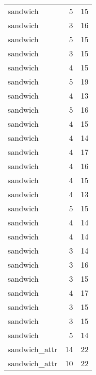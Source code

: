 \begin{table}
\begin{tabular}{lrr}
                        sandwich &         5 &        15 \\
                        sandwich &         3 &        16 \\
                        sandwich &         5 &        15 \\
                        sandwich &         3 &        15 \\
                        sandwich &         4 &        15 \\
                        sandwich &         5 &        19 \\
                        sandwich &         4 &        13 \\
                        sandwich &         5 &        16 \\
                        sandwich &         4 &        15 \\
                        sandwich &         4 &        14 \\
                        sandwich &         4 &        17 \\
                        sandwich &         4 &        16 \\
                        sandwich &         4 &        15 \\
                        sandwich &         4 &        13 \\
                        sandwich &         5 &        15 \\
                        sandwich &         4 &        14 \\
                        sandwich &         4 &        14 \\
                        sandwich &         3 &        14 \\
                        sandwich &         3 &        16 \\
                        sandwich &         3 &        15 \\
                        sandwich &         4 &        17 \\
                        sandwich &         3 &        15 \\
                        sandwich &         3 &        15 \\
                        sandwich &         5 &        14 \\
                   sandwich\_attr &        14 &        22 \\
                   sandwich\_attr &        10 &        22 \\

\end{tabular}
\end{table}
